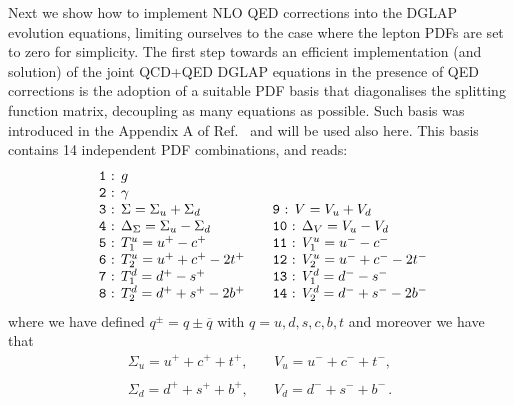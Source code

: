 Next we show how to implement NLO QED corrections
into the DGLAP evolution equations, limiting ourselves
to the case where the lepton PDFs are set to zero for
simplicity.
%
The first step towards an efficient implementation (and solution)
of the joint QCD+QED DGLAP equations in the presence
of QED corrections is the adoption
of a suitable PDF basis that diagonalises the
splitting function matrix, decoupling as many equations as
possible.
%
Such basis was  introduced
in the Appendix A of Ref.~\cite{Bertone:2015lqa} and will be used also
here.
%
This basis contains 14 independent PDF combinations, and reads:
\begin{equation}\label{eq:EvolBasis}
\begin{array}{ll}
\mbox{\texttt{ 1} : }g & \\
\mbox{\texttt{ 2} : }\gamma & \\
\mbox{\texttt{ 3} : }\displaystyle \Sigma = \Sigma_u + \Sigma_d & \quad
\mbox{\texttt{9} : }\displaystyle V =V_u +  V_d\\
\mbox{\texttt{ 4} : } \displaystyle \Delta_\Sigma = \Sigma_u - \Sigma_d& \quad\displaystyle 
\mbox{\texttt{10} : } \Delta_V = V_u - V_d\\
\mbox{\texttt{ 5} : }T_1^u = u^+ - c^+ &\quad \mbox{\texttt{11} : }V_1^u = u^- - c^- \\
\mbox{\texttt{ 6} : }T_2^u = u^+ + c^+ - 2t^+ &\quad \mbox{\texttt{12} : }V_2^u = u^- + c^- - 2t^-\\
\mbox{\texttt{ 7} : }T_1^d = d^+ - s^+ &\quad \mbox{\texttt{13} : }V_1^d = d^- - s^- \\
\mbox{\texttt{ 8} : }T_2^d = d^+ + s^+ - 2b^+ &\quad \mbox{\texttt{14}
                                               : }V_2^d = d^- + s^- -
                                               2b^-\\
\end{array}
\end{equation}
where we have defined $q^\pm = q\pm\overline{q}$ with
$q = u,d,s,c,b,t$ and moreover we have that
\begin{equation}
\begin{array}{ll}
\Sigma_u = u^++c^++t^+, &\quad V_u = u^-+c^-+t^-,\\
\\
\Sigma_d = d^++s^++b^+,&\quad V_d = d^-+s^-+b^-\,.
\end{array}
\end{equation}

